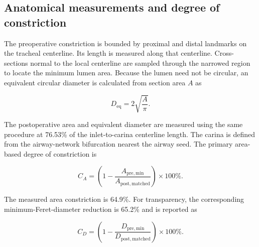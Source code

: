 \documentclass[11pt,a4paper]{article}
\begin{document}
\subsection{Anatomical measurements and degree of constriction}
\label{sec:anatomical_measurements}

The preoperative constriction is bounded by proximal and distal landmarks on the
tracheal centerline. Its length is measured along that centerline. Cross-sections
normal to the local centerline are sampled through the narrowed region to locate
the minimum lumen area. Because the lumen need not be circular, an equivalent
circular diameter is calculated from section area $A$ as

\begin{equation}
  D_{\mathrm{eq}} = 2\sqrt{\frac{A}{\pi}}.
\end{equation}

The postoperative area and equivalent diameter are measured using the same
procedure at 76.53\% of the inlet-to-carina centerline length. The carina is
defined from the airway-network bifurcation nearest the airway seed. The primary
area-based degree of constriction is

\begin{equation}
  C_A = \left(1-\frac{A_{\mathrm{pre,min}}}
  {A_{\mathrm{post,matched}}}\right)\times 100\%.
  \label{eq:area_constriction}
\end{equation}

The measured area constriction is 64.9\%. For transparency, the corresponding
minimum-Feret-diameter reduction is 65.2\% and is reported as

\begin{equation}
  C_D = \left(1-\frac{D_{\mathrm{pre,min}}}
  {D_{\mathrm{post,matched}}}\right)\times 100\%.
\end{equation}
\end{document}
